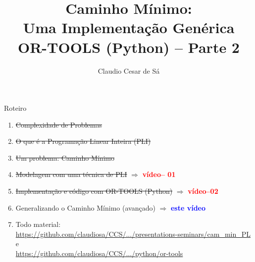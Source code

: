 \documentclass{beamer}
\title[Inteligência Artificial -- Otimização Combinatória] %
{Caminho Mínimo: \\  Uma Implementação Genérica \\ OR-TOOLS (Python) -- Parte 2}
\author[Claudio Cesar de Sá] %
{Claudio Cesar de Sá\inst{1}}
\institute[UDESC]{Pesquisador Independente}
\date[\today] %
\begin{document}
\begin{frame}
  \titlepage
\end{frame}








\begin{frame}

\begin{block}{Roteiro}

\begin{enumerate}

  \item  \sout{Complexidade de Problemas}
  \item  \sout{ O que é a Programação Linear Inteira (PLI)}
  \item   \sout{ Um problema:  Caminho Mínimo}
  \item   \sout{ Modelagem com uma técnica de PLI } $\Rightarrow$ \textbf{\textcolor{red}{vídeo-- 01}}
  \item \sout{ Implementação e código com OR-TOOLS (Python)} $\Rightarrow$  \textbf{\textcolor{red}{vídeo--02}} 
  \item  Generalizando o Caminho Mínimo (avançado) $\Rightarrow$ \textbf{\textcolor{blue}{este vídeo}} 
  \item Todo material:\\ {\small \url{https://github.com/claudiosa/CCS/.../presentations-seminars/cam_min_PL}}\\
  e\\
 {\small  \url{https://github.com/claudiosa/CCS/.../python/or-tools}}
  \end{enumerate}

\end{block}

\end{frame}
\end{document}
